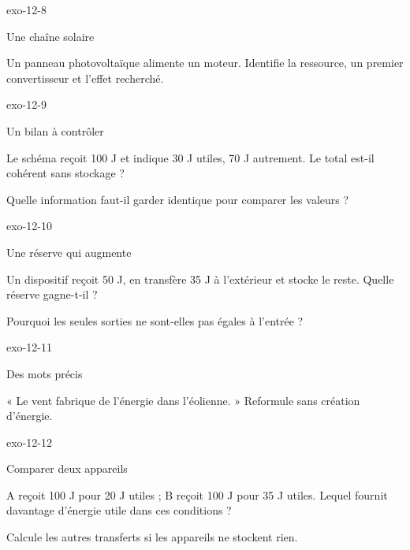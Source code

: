 \documentclass[12pt,twoside,openany]{book}
\begin{document}
\begin{blocLivre}{exo-12-8}
\begin{exercice}[2]{Une chaîne solaire}
\begin{questions}
\item Un panneau photovoltaïque alimente un moteur. Identifie la ressource, un premier convertisseur et l’effet recherché.
\end{questions}
\end{exercice}\end{blocLivre}
\begin{blocLivre}{exo-12-9}
\begin{exercice}[2]{Un bilan à contrôler}
\begin{questions}
\item Le schéma reçoit 100 J et indique 30 J utiles, 70 J autrement. Le total est-il cohérent sans stockage ?
\item Quelle information faut-il garder identique pour comparer les valeurs ?
\end{questions}
\end{exercice}\end{blocLivre}
\begin{blocLivre}{exo-12-10}
\begin{exercice}[2]{Une réserve qui augmente}
\begin{questions}
\item Un dispositif reçoit 50 J, en transfère 35 J à l’extérieur et stocke le reste. Quelle réserve gagne-t-il ?
\item Pourquoi les seules sorties ne sont-elles pas égales à l’entrée ?
\end{questions}
\end{exercice}\end{blocLivre}
\begin{blocLivre}{exo-12-11}
\begin{exercice}[2]{Des mots précis}
\begin{questions}
\item « Le vent fabrique de l’énergie dans l’éolienne. » Reformule sans création d’énergie.
\end{questions}
\end{exercice}\end{blocLivre}
\begin{blocLivre}{exo-12-12}
\begin{exercice}[3]{Comparer deux appareils}
\begin{questions}
\item A reçoit 100 J pour 20 J utiles ; B reçoit 100 J pour 35 J utiles. Lequel fournit davantage d’énergie utile dans ces conditions ?
\item Calcule les autres transferts si les appareils ne stockent rien.
\end{questions}
\end{exercice}\end{blocLivre}
\end{document}
